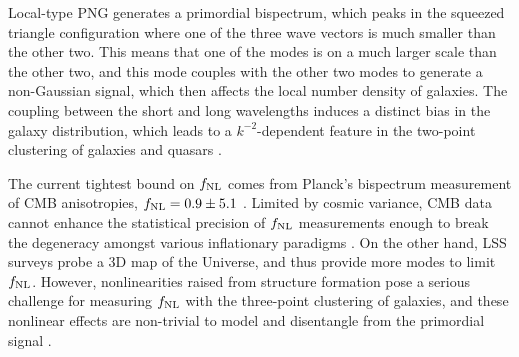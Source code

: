 Local-type PNG generates a primordial bispectrum, which peaks in the squeezed triangle configuration where one of the three wave vectors is much smaller than the other two. This means that one of the modes is on a much larger scale than the other two, and this mode couples with the other two modes to generate a non-Gaussian signal, which then affects the local number density of galaxies. The coupling between the short and long wavelengths induces a distinct bias in the galaxy distribution, which leads to a $k^{-2}$-dependent feature in the two-point clustering of galaxies and quasars \citep{dalal2008imprints}.

 The current tightest bound on $f_{\rm NL}$ comes from Planck's bispectrum measurement of CMB anisotropies, $f_{\rm NL}=0.9\pm 5.1$ \citep{akrami2019planck}. Limited by cosmic variance, CMB data cannot enhance the statistical precision of $f_{\rm NL}$ measurements enough to break the degeneracy amongst various inflationary paradigms \citep[see, e.g.,][]{2016arXiv161002743A, ade2019simons}. On the other hand, LSS surveys probe a 3D map of the Universe, and thus provide more modes to limit $f_{\rm NL}$. However, nonlinearities raised from structure formation pose a serious challenge for measuring $f_{\rm NL}$ with the three-point clustering of galaxies, and these nonlinear effects are non-trivial to model and disentangle from the primordial signal \citep{baldauf2011galaxy, baldauf2011primordial}.


